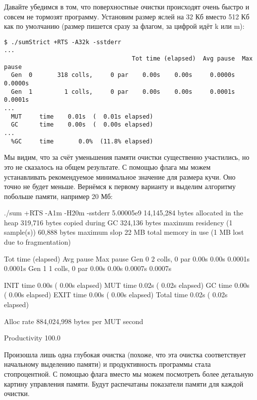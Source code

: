 Давайте убедимся в том, что поверхностные очистки происходят очень
быстро и совсем не тормозят программу. Установим размер яслей на 32 Кб
вместо 512 Кб как по умолчанию (размер пишется сразу за флагом, за
цифрой идёт k или m):


\begin{verbatim}
$ ./sumStrict +RTS -A32k -sstderr
...
                                    Tot time (elapsed)  Avg pause  Max pause
  Gen  0       318 colls,     0 par    0.00s    0.00s     0.0000s    0.0000s
  Gen  1         1 colls,     0 par    0.00s    0.00s     0.0001s    0.0001s
...
  MUT     time    0.01s  (  0.01s elapsed)
  GC      time    0.00s  (  0.00s elapsed)
...
  %GC     time       0.0%  (11.8% elapsed)
\end{verbatim}

Мы видим, что за счёт уменьшения памяти очистки существенно участились,
но это не сказалось на общем результате. С помощью флага  мы
можем устанавливать рекомендуемое минимальное значение для размера кучи.
Оно точно не будет меньше. Вернёмся к первому варианту и выделим
алгоритму побольше памяти, например 20 Мб:


\begin{code}
./sum +RTS -A1m -H20m -sstderr
5.00005e9
      14,145,284 bytes allocated in the heap
         319,716 bytes copied during GC
         324,136 bytes maximum residency (1 sample(s))
          60,888 bytes maximum slop
              22 MB total memory in use (1 MB lost due to fragmentation)

                                    Tot time (elapsed)  Avg pause  Max pause
  Gen  0         2 colls,     0 par    0.00s    0.00s     0.0001s    0.0001s
  Gen  1         1 colls,     0 par    0.00s    0.00s     0.0007s    0.0007s

  INIT    time    0.00s  (  0.00s elapsed)
  MUT     time    0.02s  (  0.02s elapsed)
  GC      time    0.00s  (  0.00s elapsed)
  EXIT    time    0.00s  (  0.00s elapsed)
  Total   time    0.02s  (  0.02s elapsed)


  Alloc rate    884,024,998 bytes per MUT second

  Productivity 100.0%
\end{code}

Произошла лишь одна глубокая очистка (похоже, что эта очистка
соответствует начальному выделению памяти) и продуктивность программы
стала стопроцентной. С помощью флага  вместо  мы можем
посмотреть более детальную картину управления памяти. Будут распечатаны
показатели памяти для каждой очистки.


